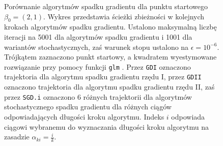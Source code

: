 \begin{figure}[hbt!]
  \caption[Porównanie algorytmów spadku gradientu dla punktu startowego $\beta_0 = (2,1)$.]{\label{fig:sc2asd}Porównanie algorytmów spadku gradientu dla punktu startowego $\beta_0 = (2,1)$. Wykres przedstawia ścieżki zbieżności w kolejnych krokach algorytmów spadku gradientu. Ustalono maksymalną liczbę iteracji na 5001 dla algorytmów spadku gradientu i 1001 dla wariantów stochastycznych, zaś warunek stopu ustalono na $\epsilon=10^{-6}$. Trójkątem zaznaczono punkt startowy, a kwadratem wyestymowane rozwiązanie przy pomocy funkcji \texttt{glm} \cite{glmglm}. Przez \texttt{GDI} oznaczono trajektoria dla algorytmu spadku gradientu rzędu I, przez \texttt{GDII} oznaczono trajektoria dla algorytmu spadku gradientu rzędu II, zaś przez \texttt{SGD.i} oznaczono 6 różnych trajektorii dla algorytmów stochastycznego spadku gradientu dla różnych ciągów odpowiadających długości kroku algorytmu. Indeks $i$ odpowiada ciągowi wybranemu do wyznaczania długości kroku algorytmu na zasadzie $\alpha_{ki} = \frac{i}{k}$.}
\end{figure}


